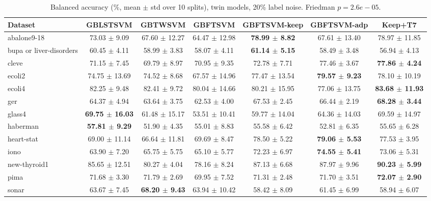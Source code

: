 \begin{table}[t]
\centering\small
\caption{Balanced accuracy (\%, mean $\pm$ std over 10 splits), twin models, 20\% label noise. Friedman $p = 2.6e-05$.}
\begin{tabular}{lcccccc}
\toprule
Dataset & GBLSTSVM & GBTWSVM & GBFTSVM & GBFTSVM-keep & GBFTSVM-adp & Keep+T7 \\
\midrule
abalone9-18 & 73.03 $\pm$ 9.09 & 67.60 $\pm$ 12.27 & 64.47 $\pm$ 12.98 & \textbf{78.99 $\pm$ 8.82} & 67.61 $\pm$ 13.40 & 78.97 $\pm$ 11.85 \\
bupa or liver-disorders & 60.45 $\pm$ 4.11 & 58.99 $\pm$ 3.83 & 58.07 $\pm$ 4.11 & \textbf{61.14 $\pm$ 5.15} & 58.49 $\pm$ 3.48 & 56.94 $\pm$ 4.13 \\
cleve & 71.15 $\pm$ 7.45 & 69.79 $\pm$ 8.97 & 70.95 $\pm$ 9.35 & 72.78 $\pm$ 7.71 & 77.46 $\pm$ 3.67 & \textbf{77.86 $\pm$ 4.24} \\
ecoli2 & 74.75 $\pm$ 13.69 & 74.52 $\pm$ 8.68 & 67.57 $\pm$ 14.96 & 77.47 $\pm$ 13.54 & \textbf{79.57 $\pm$ 9.23} & 78.10 $\pm$ 10.19 \\
ecoli4 & 82.25 $\pm$ 9.48 & 82.41 $\pm$ 9.72 & 80.04 $\pm$ 14.66 & 80.21 $\pm$ 15.95 & 77.06 $\pm$ 13.75 & \textbf{83.68 $\pm$ 11.93} \\
ger & 64.37 $\pm$ 4.94 & 63.64 $\pm$ 3.75 & 62.53 $\pm$ 4.00 & 67.53 $\pm$ 2.45 & 66.44 $\pm$ 2.19 & \textbf{68.28 $\pm$ 3.44} \\
glass4 & \textbf{69.75 $\pm$ 16.03} & 61.48 $\pm$ 15.17 & 53.51 $\pm$ 10.41 & 59.77 $\pm$ 14.04 & 64.36 $\pm$ 14.03 & 69.59 $\pm$ 14.97 \\
haberman & \textbf{57.81 $\pm$ 9.29} & 51.90 $\pm$ 4.35 & 55.01 $\pm$ 8.83 & 55.58 $\pm$ 6.42 & 52.81 $\pm$ 6.35 & 55.65 $\pm$ 6.28 \\
heart-stat & 69.00 $\pm$ 11.14 & 66.64 $\pm$ 11.81 & 69.69 $\pm$ 8.47 & 78.50 $\pm$ 5.22 & \textbf{79.06 $\pm$ 5.53} & 77.53 $\pm$ 3.95 \\
iono & 63.90 $\pm$ 7.20 & 65.75 $\pm$ 5.75 & 65.10 $\pm$ 5.77 & 72.23 $\pm$ 6.97 & \textbf{74.55 $\pm$ 5.41} & 73.06 $\pm$ 5.31 \\
new-thyroid1 & 85.65 $\pm$ 12.51 & 80.27 $\pm$ 4.04 & 78.16 $\pm$ 8.24 & 87.13 $\pm$ 6.68 & 87.97 $\pm$ 9.96 & \textbf{90.23 $\pm$ 5.99} \\
pima & 71.68 $\pm$ 3.30 & 71.79 $\pm$ 2.69 & 69.95 $\pm$ 7.52 & 71.31 $\pm$ 2.48 & 71.70 $\pm$ 3.51 & \textbf{72.07 $\pm$ 2.90} \\
sonar & 63.67 $\pm$ 7.45 & \textbf{68.20 $\pm$ 9.43} & 63.94 $\pm$ 10.42 & 58.42 $\pm$ 8.09 & 61.45 $\pm$ 6.99 & 58.94 $\pm$ 6.07 \\

\end{tabular}
\end{table}
